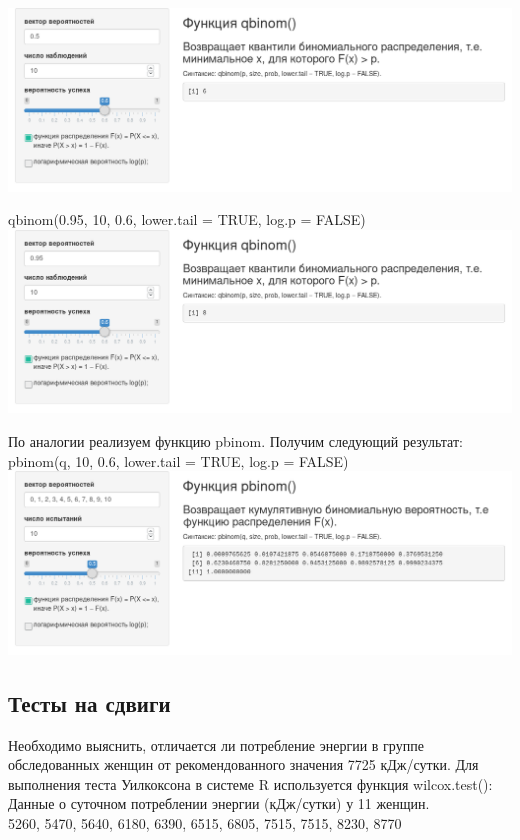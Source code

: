 \documentclass[14pt,a4paper]{scrartcl}
\begin{document}
    \includegraphics[width=\textwidth]{qbinom.png}

    qbinom(0.95, 10, 0.6, lower.tail = TRUE, log.p = FALSE)\\

    \includegraphics[width=\textwidth]{qbinom-2.png}

    \newpage
    По аналогии реализуем функцию pbinom. Получим следующий результат:\\

    pbinom(q, 10, 0.6, lower.tail = TRUE, log.p = FALSE)\\

    \includegraphics[width=\textwidth]{pbinom-1.png}

    \subsection{Тесты на сдвиги}

     Необходимо выяснить, отличается ли потребление энергии в группе обследованных женщин от рекомендованного значения 7725 кДж/сутки. Для выполнения теста Уилкоксона в системе R используется функция wilcox.test():
    Данные о суточном потреблении энергии (кДж/сутки) у 11 женщин. \cite{Altman} \\
    5260, 5470, 5640, 6180, 6390, 6515, 6805, 7515, 7515, 8230, 8770
\end{document}

